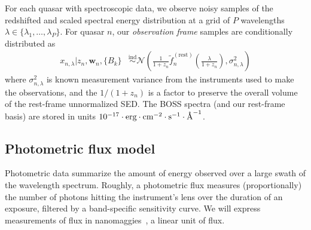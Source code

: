 \documentclass{article} %
\begin{document}
For each quasar with spectroscopic data, we observe noisy samples of the redshifted and scaled spectral energy distribution at a grid of $P$ wavelengths ${\lambda \in \{\lambda_1, \dots, \lambda_P \}}$.
For quasar $n$, our \emph{observation frame} samples are conditionally distributed as
\begin{align}
  x_{n, \lambda} | z_n, \mathbf{w}_n, \{ B_k \} 
    &\stackrel{\textrm{ind}}{\sim} \mathcal{N}\left( \frac{1}{1 + z_n} \tilde f_n^{(\text{rest})}\left( \frac{\lambda}{1 + z_n} \right), \sigma_{n,\lambda}^2 \right)
    \label{eq:spec} 
\end{align}
where $\sigma_{n, \lambda}^2$ is known measurement variance from the instruments used to make the observations, and the $1/(1+z_n)$ is a factor to preserve the overall volume of the rest-frame unnormalized SED. 
The BOSS spectra (and our rest-frame basis) are stored in units ${10^{-17} \cdot \text{erg} \cdot \text{cm}^{-2} \cdot \text{s}^{-1} \cdot \textup{\AA}^{-1}}$.  

\subsection{Photometric flux model }
Photometric data summarize the amount of energy observed over a large swath of the wavelength spectrum. 
Roughly, a photometric flux measures (proportionally) the number of photons hitting the instrument's lens over the duration of an exposure, filtered by a band-specific sensitivity curve. 
We will express measurements of flux in nanomaggies~\cite{sdssnanomaggies}, a linear unit of flux. 
\end{document}
